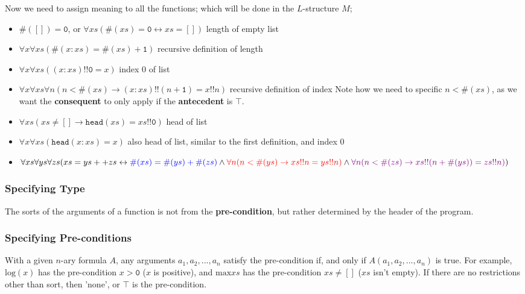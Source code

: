 \documentclass[a4paper, 12pt]{article}
\begin{document}
                Now we need to assign meaning to all the functions; which will be done in the $L$-structure $M$;
                \begin{itemize}
                    \item $\#([]) = \texttt{0}$, or $\forall xs (\#(xs) = \texttt{0} \leftrightarrow xs = [])$ \hfill length of empty list
                    \item $\forall x \forall xs (\#(x : xs) = \#(xs) + \texttt{1})$ \hfill recursive definition of length
                    \item $\forall x \forall xs ((x : xs) !! \texttt{0} = x)$ \hfill index 0 of list
                    \item $\forall x \forall xs \forall n (n < \#(xs) \rightarrow (x : xs) !! (n + \texttt{1}) = x !! n)$ \hfill recursive definition of index
                        \subitem Note how we need to specific $n < \#(xs)$, as we want the \textbf{consequent} to only apply if the \textbf{antecedent} is $\top$.
                    \item $\forall xs (xs \neq [] \rightarrow \texttt{head}(xs) = xs !! \texttt{0})$ \hfill head of list
                    \item $\forall x \forall xs (\texttt{head}(x : xs) = x)$ \hfill also head of list, similar to the first definition, and index 0
                    \item $\forall xs \forall ys \forall zs (xs = ys ++ zs \leftrightarrow \\ \textcolor{blue}{\#(xs) = \#(ys) + \#(zs)} \land \\ \textcolor{red}{\forall n (n < \#(ys) \rightarrow xs !! n = ys !! n)} \land \\ \textcolor{violet}{\forall n (n < \#(zs) \rightarrow xs !! (n + \#(ys)) = zs !! n)})$
                \end{itemize}
            \subsubsection*{Specifying Type}
                The sorts of the arguments of a function is not from the \textbf{pre-condition}, but rather determined by the header of the program.
            \subsubsection*{Specifying Pre-conditions}
                With a given $n$-ary formula $A$, any arguments $a_1, a_2, ..., a_n$ satisfy the pre-condition if, and only if $A(a_1, a_2, ..., a_n)$ is true. For example, $\text{log}(x)$ has the pre-condition $x > \texttt{0}$ ($x$ is positive), and $\text{max} xs$ has the pre-condition $xs \neq []$ ($xs$ isn't empty). If there are no restrictions other than sort, then 'none', or $\top$ is the pre-condition.
\end{document}

